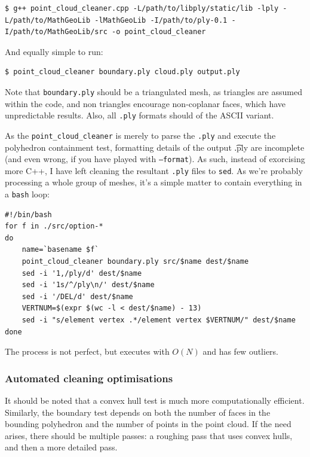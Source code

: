\begin{lstlisting}
$ g++ point_cloud_cleaner.cpp -L/path/to/libply/static/lib -lply -L/path/to/MathGeoLib -lMathGeoLib -I/path/to/ply-0.1 -I/path/to/MathGeoLib/src -o point_cloud_cleaner
\end{lstlisting}

And equally simple to run:

\begin{lstlisting}
$ point_cloud_cleaner boundary.ply cloud.ply output.ply
\end{lstlisting}

Note that {\tt boundary.ply} should be a triangulated mesh, as triangles are assumed within the code, and non triangles encourage non-coplanar faces, which have unpredictable results. Also, all {\tt .ply} formats should of the ASCII variant.

As the {\tt point\_cloud\_cleaner} is merely to parse the {\tt .ply} and execute the polyhedron containment test, formatting details of the output {\t .ply} are incomplete (and even wrong, if you have played with {\tt --format}). As such, instead of exorcising more C++, I have left cleaning the resultant {\tt .ply} files to {\tt sed}. As we're probably processing a whole group of meshes, it's a simple matter to contain everything in a {\tt bash} loop:

\begin{lstlisting}
#!/bin/bash
for f in ./src/option-*
do
    name=`basename $f`
    point_cloud_cleaner boundary.ply src/$name dest/$name
    sed -i '1,/ply/d' dest/$name
    sed -i '1s/^/ply\n/' dest/$name
    sed -i '/DEL/d' dest/$name
    VERTNUM=$(expr $(wc -l < dest/$name) - 13)
    sed -i "s/element vertex .*/element vertex $VERTNUM/" dest/$name
done
\end{lstlisting}

The process is not perfect, but executes with $O(N)$ and has few outliers.

\subsubsection{Automated cleaning optimisations}

It should be noted that a convex hull test is much more computationally efficient. Similarly, the boundary test depends on both the number of faces in the bounding polyhedron and the number of points in the point cloud. If the need arises, there should be multiple passes: a roughing pass that uses convex hulls, and then a more detailed pass.

